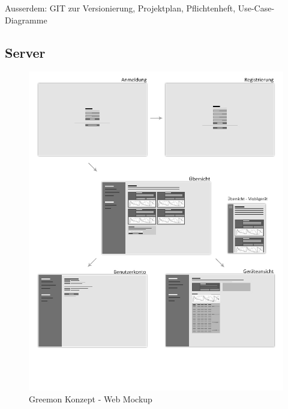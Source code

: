 \documentclass[pointlessnumbers]{scrartcl}
\begin{document}
 

Ausserdem: GIT zur Versionierung, Projektplan, Pflichtenheft, Use-Case-Diagramme


\subsection{Server}

\begin{figure}[htbp] 
  \centering
     \includegraphics[width=1\textwidth]{wireframe-web.jpg}
  \caption{Greemon Konzept - Web Mockup}
  \label{fig:greemon-web-mockup}
\end{figure}
\end{document}
